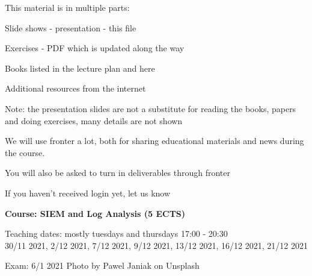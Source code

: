 \documentclass[Screen16to9,17pt]{foils}
\begin{document}

\begin{list1}
\item This material is in multiple parts:
\begin{list2}
\item Slide shows - presentation - this file
\item Exercises - PDF which is updated along the way
\end{list2}
\item Books listed in the lecture plan and here
\item Additional resources from the internet
\item Note: the presentation slides are not a substitute for reading the books, papers and doing exercises, many details are not shown
\end{list1}





We will use fronter a lot, both for sharing educational materials and news during the course.

You will also be asked to turn in deliverables through fronter


\vskip 5mm
\centerline{If you haven't received login yet, let us know}








{\Large\bf Course: SIEM and Log Analysis (5 ECTS)}

Teaching dates: mostly tuesdays and thursdays 17:00 - 20:30\\
30/11 2021, 2/12 2021, 7/12 2021, 9/12 2021, 13/12 2021, 16/12 2021, 21/12 2021

Exam: 6/1 2021 \hskip 12cm Photo by Pawel Janiak on Unsplash

\end{document}

